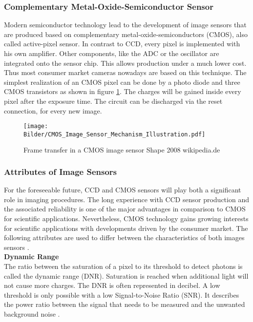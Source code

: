 \subsubsection{Complementary Metal-Oxide-Semiconductor Sensor}

Modern semiconductor technology lead to the development of image sensors that are produced based on complementary metal-oxide-semiconductors (CMOS), also called active-pixel sensor. In contrast to CCD, every pixel is implemented with his own amplifier. Other components, like the ADC or the oscillator are integrated onto the sensor chip. This allows production under a much lower cost. Thus most consumer market cameras nowadays are based on this technique. The simplest realization of an CMOS pixel can be done by a photo diode and three CMOS transistors as shown in figure \ref{fig:CMOS_architecture_storage_pixels}. The charges will be gained inside every pixel after the exposure time. The circuit can be discharged via the reset connection, for every new image.

\begin{figure} [!h]
	\centering
	\texttt{[image: Bilder/CMOS\_Image\_Sensor\_Mechanism\_Illustration.pdf]}
	\caption{Frame transfer in a CMOS image sensor \tiny Shape 2008 wikipedia.de}
	\label{fig:CMOS_architecture_storage_pixels}
\end{figure} 

\newpage
\subsubsection{Attributes of Image Sensors}
For the foreseeable future, CCD and CMOS sensors will play both a significant role in imaging procedures. The long experience with CCD sensor production and the associated reliability is one of the major advantages in comparison to CMOS for scientific applications. Nevertheless, CMOS technology gains growing interests for scientific applications with developments driven by the consumer market. The following attributes are used to differ between the characteristics of both images sensors \cite{neugebauer1991parallel} \cite{litwiller2005cmos}.\\
     
\textbf{Dynamic Range}\\
The ratio between the saturation of a pixel to its threshold to detect photons is called the dynamic range (DNR). Saturation is reached when additional light will not cause more charges. The DNR is often represented in decibel. A low threshold is only possible with a low Signal-to-Noise Ratio (SNR). It describes the power ratio between the signal that needs to be measured and the unwanted background noise \cite{bushberg2011essential}. 

